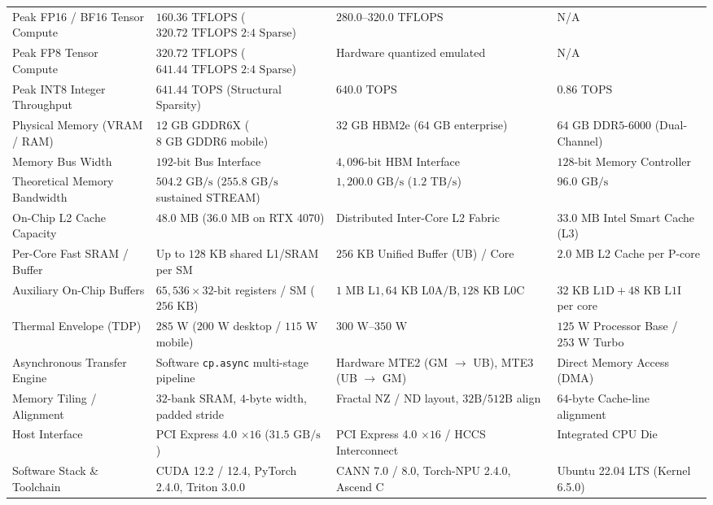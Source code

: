 \begin{table}[!t]
\begin{tabularx}{\textwidth}{@{}p{4.2cm}XXX@{}}
Peak FP16 / BF16 Tensor Compute & $160.36\text{ TFLOPS}$ ($320.72\text{ TFLOPS 2:4 Sparse}$) & $280.0\text{--}320.0\text{ TFLOPS}$ & N/A \\
Peak FP8 Tensor Compute & $320.72\text{ TFLOPS}$ ($641.44\text{ TFLOPS 2:4 Sparse}$) & Hardware quantized emulated & N/A \\
Peak INT8 Integer Throughput & $641.44\text{ TOPS}$ (Structural Sparsity) & $640.0\text{ TOPS}$ & $0.86\text{ TOPS}$ \\
\midrule
Physical Memory (VRAM / RAM) & $12\text{ GB GDDR6X}$ ($8\text{ GB GDDR6 mobile}$) & $32\text{ GB HBM2e}$ ($64\text{ GB enterprise}$) & $64\text{ GB DDR5-6000}$ (Dual-Channel) \\
Memory Bus Width & $192\text{-bit}$ Bus Interface & $4{,}096\text{-bit}$ HBM Interface & $128\text{-bit}$ Memory Controller \\
Theoretical Memory Bandwidth & $504.2\text{ GB/s}$ ($255.8\text{ GB/s}$ sustained STREAM) & $1{,}200.0\text{ GB/s}$ ($1.2\text{ TB/s}$) & $96.0\text{ GB/s}$ \\
\midrule
On-Chip L2 Cache Capacity & $48.0\text{ MB}$ ($36.0\text{ MB}$ on RTX 4070) & Distributed Inter-Core L2 Fabric & $33.0\text{ MB}$ Intel Smart Cache (L3) \\
Per-Core Fast SRAM / Buffer & Up to $128\text{ KB}$ shared L1/SRAM per SM & $256\text{ KB}$ Unified Buffer (UB) / Core & $2.0\text{ MB}$ L2 Cache per P-core \\
Auxiliary On-Chip Buffers & $65{,}536\times 32\text{-bit}$ registers / SM ($256\text{ KB}$) & $1\text{ MB L1}, 64\text{ KB L0A/B}, 128\text{ KB L0C}$ & $32\text{ KB L1D} + 48\text{ KB L1I}$ per core \\
\midrule
Thermal Envelope (TDP) & $285\text{ W}$ ($200\text{ W}$ desktop / $115\text{ W}$ mobile) & $300\text{ W}\text{--}350\text{ W}$ & $125\text{ W}$ Processor Base / $253\text{ W}$ Turbo \\
Asynchronous Transfer Engine & Software \texttt{cp.async} multi-stage pipeline & Hardware MTE2 (GM $\to$ UB), MTE3 (UB $\to$ GM) & Direct Memory Access (DMA) \\
Memory Tiling / Alignment & $32\text{-bank SRAM}$, $4\text{-byte width}$, padded stride & Fractal NZ / ND layout, $32\text{B} / 512\text{B}$ align & $64\text{-byte}$ Cache-line alignment \\
\midrule
Host Interface & PCI Express 4.0 $\times 16$ ($31.5\text{ GB/s}$) & PCI Express 4.0 $\times 16$ / HCCS Interconnect & Integrated CPU Die \\
Software Stack \& Toolchain & CUDA 12.2 / 12.4, PyTorch 2.4.0, Triton 3.0.0 & CANN 7.0 / 8.0, Torch-NPU 2.4.0, Ascend C & Ubuntu 22.04 LTS (Kernel 6.5.0) \\
\bottomrule
\end{tabularx}
\end{table}

